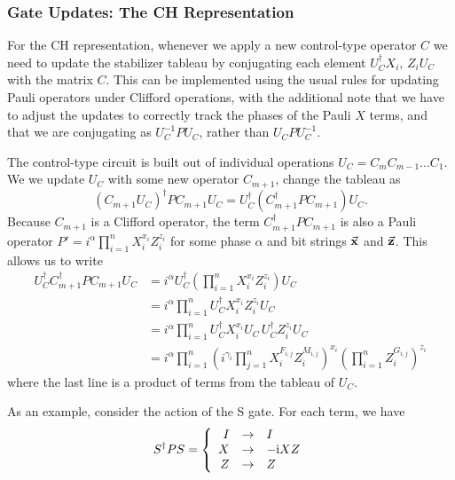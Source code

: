 \subsubsection{Gate Updates: The CH Representation}
For the CH representation, whenever we apply a new control-type operator $C$ we need to update the stabilizer tableau by conjugating each element $U_{C}^{\dagger}X_{i},\,Z_{i}U_{C}$ with the matrix $C$. This can be implemented using the usual rules for updating Pauli operators under Clifford operations, with the additional note that we have to adjust the updates to correctly track the phases of the Pauli $X$ terms, and that we are conjugating as $U_{C}^{-1}PU_{C}$, rather than $U_{C}PU_{C}^{-1}$. \par
The control-type circuit is built out of individual operations $U_{C}=C_{m}C_{m-1}\dots C_{1}$. We we update $U_{C}$ with some new operator $C_{m+1}$, change the tableau as
\begin{equation}
\left(C_{m+1}U_{C}\right)^{\dagger} P C_{m+1}U_{C} = U_{C}^{\dagger} \left(C_{m+1}^{\dagger}PC_{m+1}\right)U_{C}.
\end{equation}
Because $C_{m+1}$ is a Clifford operator, the term $C^{\dagger}_{m+1}PC_{m+1}$ is also a Pauli operator $P'=i^{\alpha}\prod_{i=1}^{n}X_{i}^{x_{i}}Z_{i}^{z_{i}}$ for some phase $\alpha$ and bit strings $\va{x}$ and $\va{z}$. This allows us to write
\begin{align}
U_{C}^{\dagger} C_{m+1}^{\dagger}PC_{m+1} U_{C} &= i^{\alpha} U_{C}^{\dagger}\left(\prod_{i=1}^{n}X_{i}^{x_{i}}Z_{i}^{z_{i}}\right)U_{C} \nonumber \\
&= i^{\alpha} \prod_{i=1}^{n} U_{C}^{\dagger} X_{i}^{x_{i}} Z_{i}^{z_{i}}U_{C} \nonumber \\
&= i^{\alpha} \prod_{i=1}^{n}U_{C}^{\dagger} X_{i}^{x_{i}}U_{C}\,U_{C}^{\dagger}Z_{i}^{z_{i}}U_{C} \nonumber \\
&= i^{\alpha} \prod_{i=1}^{n}\left(i^{\gamma_{i}} \prod_{j=1}^{n}X_{i}^{F_{i,j}}Z_{i}^{M_{i,j}}\right)^{x_{i}}\left(\prod_{i=1}^{n}Z_{i}^{G_{i,j}}\right)^{z_{i}}
\label{eq:expanded_leftupdate}
\end{align}
where the last line is a product of terms from the tableau of $U_{C}$.\par
As an example, consider the action of the S gate. For each term, we have
\[
S^{\dagger}PS =  \left\{ \begin{array}{rcl}
    I & \rightarrow & I \\
    X & \rightarrow & -\mathrm{i} XZ \\
    Z & \rightarrow & Z \\
    \end{array}\right.
\]
